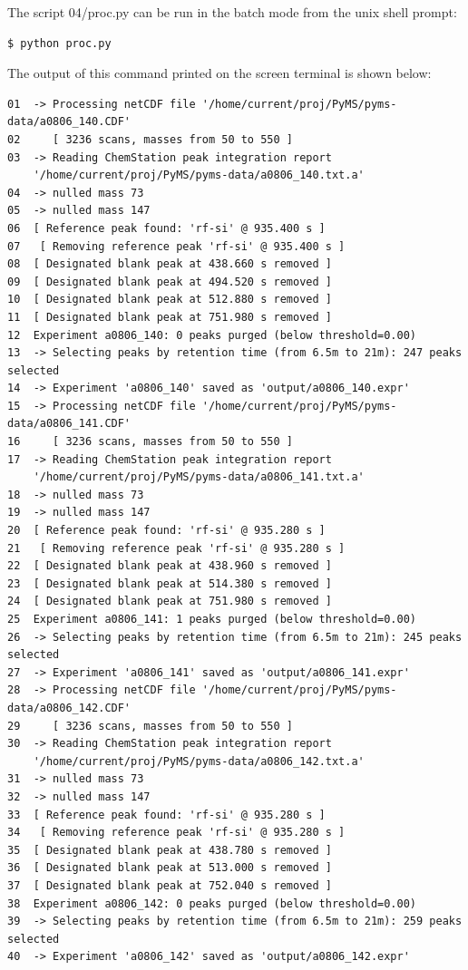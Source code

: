 The script 04/proc.py can be run in the batch mode from the unix shell
prompt:

\begin{verbatim}
$ python proc.py
\end{verbatim}

\noindent
The output of this command printed on the screen terminal is shown below:

\begin{verbatim}
01  -> Processing netCDF file '/home/current/proj/PyMS/pyms-data/a0806_140.CDF'
02     [ 3236 scans, masses from 50 to 550 ]
03  -> Reading ChemStation peak integration report
    '/home/current/proj/PyMS/pyms-data/a0806_140.txt.a'
04  -> nulled mass 73
05  -> nulled mass 147
06  [ Reference peak found: 'rf-si' @ 935.400 s ]
07   [ Removing reference peak 'rf-si' @ 935.400 s ]
08 	[ Designated blank peak at 438.660 s removed ]
09 	[ Designated blank peak at 494.520 s removed ]
10 	[ Designated blank peak at 512.880 s removed ]
11 	[ Designated blank peak at 751.980 s removed ]
12  Experiment a0806_140: 0 peaks purged (below threshold=0.00)
13  -> Selecting peaks by retention time (from 6.5m to 21m): 247 peaks selected
14  -> Experiment 'a0806_140' saved as 'output/a0806_140.expr'
15  -> Processing netCDF file '/home/current/proj/PyMS/pyms-data/a0806_141.CDF'
16     [ 3236 scans, masses from 50 to 550 ]
17  -> Reading ChemStation peak integration report
    '/home/current/proj/PyMS/pyms-data/a0806_141.txt.a'
18  -> nulled mass 73
19  -> nulled mass 147
20  [ Reference peak found: 'rf-si' @ 935.280 s ]
21   [ Removing reference peak 'rf-si' @ 935.280 s ]
22 	[ Designated blank peak at 438.960 s removed ]
23 	[ Designated blank peak at 514.380 s removed ]
24 	[ Designated blank peak at 751.980 s removed ]
25  Experiment a0806_141: 1 peaks purged (below threshold=0.00)
26  -> Selecting peaks by retention time (from 6.5m to 21m): 245 peaks selected
27  -> Experiment 'a0806_141' saved as 'output/a0806_141.expr'
28  -> Processing netCDF file '/home/current/proj/PyMS/pyms-data/a0806_142.CDF'
29     [ 3236 scans, masses from 50 to 550 ]
30  -> Reading ChemStation peak integration report
    '/home/current/proj/PyMS/pyms-data/a0806_142.txt.a'
31  -> nulled mass 73
32  -> nulled mass 147
33  [ Reference peak found: 'rf-si' @ 935.280 s ]
34   [ Removing reference peak 'rf-si' @ 935.280 s ]
35 	[ Designated blank peak at 438.780 s removed ]
36 	[ Designated blank peak at 513.000 s removed ]
37 	[ Designated blank peak at 752.040 s removed ]
38  Experiment a0806_142: 0 peaks purged (below threshold=0.00)
39  -> Selecting peaks by retention time (from 6.5m to 21m): 259 peaks selected
40  -> Experiment 'a0806_142' saved as 'output/a0806_142.expr'
\end{verbatim}

